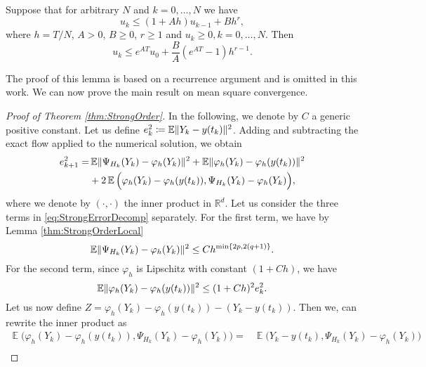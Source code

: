 \documentclass{siamart1116}
\numberwithin{theorem}{section}
\DeclarePairedDelimiter{\norm}{\|}{\|}
\renewcommand{\phi}{\varphi}
\newcommand{\R}{\mathbb{R}}
\newcommand{\defeq}{\coloneqq}
\newcommand{\E}{\operatorname{\mathbb{E}}}
\newcommand{\corr}[1]{{\color{bordeaux}#1}}
\begin{document}
\begin{lemma}\label{lem:RecurrenceBound} Suppose that for arbitrary $N$ and $k = 0, \ldots, N$ we have
	\corr{\begin{equation}
		u_{k} \leq (1 + Ah) u_{k-1} + Bh^r,
	\end{equation}}
	where $h = T / N$, $A > 0$, $B \geq 0$, $r \geq 1$ and $u_k \geq 0, k = 0, \ldots, N$. Then
	\begin{equation}
		u_k \leq e^{AT}u_0 + \frac{B}{A}(e^{AT} - 1) h^{r-1}.
	\end{equation}
\end{lemma}
The proof of this lemma is based on a recurrence argument and is omitted in this work. We can now prove the main result on mean square convergence.
\begin{proof}[Proof of Theorem \ref{thm:StrongOrder}] In the following, we denote by $C$ a generic positive constant. Let us define $e_k^2 \defeq \E\norm{Y_k - y(t_k)}^2$. Adding and subtracting the exact flow applied to the numerical solution, we obtain
	\begin{equation}\label{eq:StrongErrorDecomp}
		\begin{aligned}
			e_{k+1}^2 = &\E\norm{\Psi_{H_k}(Y_k) - \phi_{h}(Y_k)}^2 + \E\norm{\phi_{h}(Y_k) - \phi_{h}(y(t_k))}^2 \\
					  &+ 2\E\Big(\phi_{h}(Y_k) - \phi_{h}(y(t_k)), \Psi_{H_k}(Y_k) - \phi_{h}(Y_k)\Big),
		\end{aligned}
	\end{equation}
	where we denote by $(\cdot, \cdot)$ the inner product in $\R^d$. Let us consider the three terms in \eqref{eq:StrongErrorDecomp} separately. For the first term, we have by Lemma \ref{thm:StrongOrderLocal}
	\corr{\begin{equation}\label{eq:StrongFirstTerm}
		\E\norm{\Psi_{H_k}(Y_k) - \phi_{h}(Y_k)}^2 \leq Ch^{\min\{2p, 2(q+1)\}}.
	\end{equation}}
    For the second term, since $\phi_h$ is Lipschitz with constant $(1 + Ch)$, we have
	\begin{equation}\label{eq:StrongSecondTerm}
		\E\norm{\phi_{h}(Y_k) - \phi_{h}(y(t_k))}^2 \leq (1 + Ch)^2 e_k^2.
	\end{equation}
	Let us now \corr{define $Z = \phi_{h}(Y_k) - \phi_{h}(y(t_k)) - (Y_k - y(t_k))$. Then we, can rewrite the inner product as}
	\begin{equation}\label{eq:StrongScalarProd}
	\begin{aligned}
		\E\Big(\phi_{h}(Y_k) - \phi_{h}(y(t_k)), \Psi_{H_k}(Y_k) - \phi_{h}(Y_k)\Big) = &\E\Big(Y_k - y(t_k), \Psi_{H_k}(Y_k) - \phi_{h}(Y_k)\Big) \\

\end{aligned}
\end{equation}
\end{proof}
\end{document}
